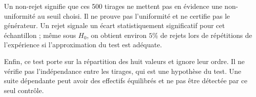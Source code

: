 {{Un non-rejet signifie que ces 500 tirages ne mettent pas en évidence une non-uniformité au seuil choisi. Il ne prouve pas l'uniformité et ne certifie pas le générateur. Un rejet signale un écart statistiquement significatif pour cet échantillon ; même sous $H_0$, on obtient environ $5\%$ de rejets lors de répétitions de l'expérience si l'approximation du test est adéquate.

Enfin, ce test porte sur la répartition des huit valeurs et ignore leur ordre. Il ne vérifie pas l'indépendance entre les tirages, qui est une hypothèse du test. Une suite dépendante peut avoir des effectifs équilibrés et ne pas être détectée par ce seul contrôle.
}
}
